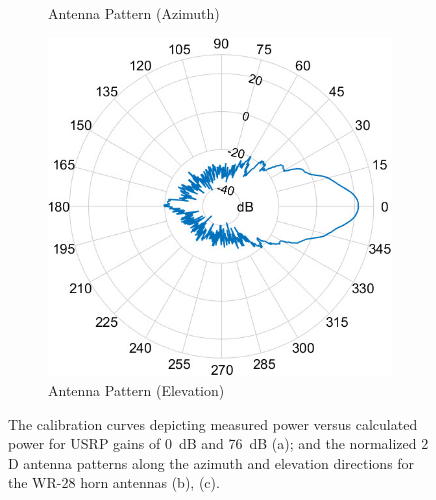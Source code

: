 \documentclass[12pt, draftcls, onecolumn]{IEEEtran}
\begin{document}
\begin{figure} [t]
\begin{subfigure}{0.31\linewidth}
         \caption{Antenna Pattern (Azimuth)}
         \label{F4b}
     \end{subfigure}
     \begin{subfigure}{0.31\linewidth}
         \centering
         \includegraphics[width=1.0\linewidth]{figs/antenna_elevation.jpg}
         \caption{Antenna Pattern (Elevation)}
         \label{F4c}
     \end{subfigure}
     \caption{The calibration curves depicting measured power versus calculated power for USRP gains of \SI{0}{\deci\bel} and \SI{76}{\deci\bel} (a); and the normalized $2$D antenna patterns along the azimuth and elevation directions for the WR-$28$ horn antennas (b), (c).}
     \label{F4}
\end{figure}
\end{document}
